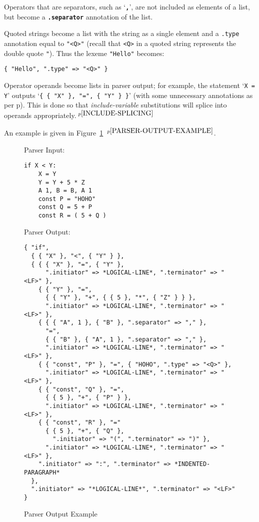\documentclass[12pt]{article}
\newcommand{\TT}[1]{{\tt \bfseries #1}}
\newcommand{\ttkey}[1]{{\tt \bfseries #1}}
\newcommand{\pagref}[1]{p\pageref{#1}}
\newcommand{\pagnote}[1]{$\,^{p\pageref{#1}}$}
\newlength{\figurewidth}
\newenvironment{boxedfigure}[1][!btp]%
	{\begin{figure*}[#1]
	 \begin{lrbox}{\figurebox}
	 \begin{minipage}{\figurewidth}

	 \vspace*{1ex}}%
	{
	 \vspace*{1ex}

	 \end{minipage}
	 \end{lrbox}

	 \centering
	 \fbox{\hspace*{0.1in}\usebox{\figurebox}\hspace*{0.1in}}
	 \end{figure*}}
\newenvironment{indpar}[1][0.3in]%
	{\begin{list}{}%
		     {\setlength{\itemsep}{0in}%
		      \setlength{\topsep}{0in}%
		      \setlength{\parsep}{1ex}%
		      \setlength{\labelwidth}{#1}%
		      \setlength{\leftmargin}{#1}%
		      \addtolength{\leftmargin}{\labelsep}}%
	 \item}%
	{\end{list}}
\begin{document}
Operators that are separators, such as `\TT{,}', are not included as elements
of a list, but become a \ttkey{.separator} annotation of the list.

Quoted strings become a list with the string as a single element
and a {\tt .type} annotation equal to {\tt "<Q>"}
(recall that {\tt <Q>} in a quoted string represents the double quote {\tt "}).
Thus the lexeme {\tt "Hello"} becomes: \\
\centerline{\tt \{ "Hello", ".type" => "<Q>" \} }

Operator operands become lists in parser output;
for example, the statement `{\tt X = Y}' outputs
`{\tt \{ \{ "X" \}, "=", \{ "Y" \} \}}' (with some unnecessary annotations as
per \pagref{UNNECESSARY-ANNOTATIONS}).
This is done so that {\em include-variable} substitutions will splice
into operands appropriately.\pagnote{INCLUDE-SPLICING}

An example is given in Figure~\ref{PARSER-OUTPUT-EXAMPLE}%
\pagnote{PARSER-OUTPUT-EXAMPLE}.

\begin{boxedfigure}[!p]
\begin{indpar}[1em]


Parser Input:
\begin{indpar}[1em]\begin{verbatim}
if X < Y:
    X = Y
    Y = Y + 5 * Z
    A 1, B = B, A 1
    const P = "HOHO"
    const Q = 5 + P
    const R = ( 5 + Q )
\end{verbatim}\end{indpar}

\medskip

Parser Output:
\begin{indpar}[1em]\begin{verbatim}
{ "if",
  { { "X" }, "<", { "Y" } },
  { { { "X" }, "=", { "Y" },
      ".initiator" => *LOGICAL-LINE*, ".terminator" => "<LF>" },
    { { "Y" }, "=",
      { { "Y" }, "+", { { 5 }, "*", { "Z" } } },
      ".initiator" => *LOGICAL-LINE*, ".terminator" => "<LF>" },
    { { { "A", 1 }, { "B" }, ".separator" => "," },
      "=",
      { { "B" }, { "A", 1 }, ".separator" => "," },
      ".initiator" => *LOGICAL-LINE*, ".terminator" => "<LF>" },
    { { "const", "P" }, "=", { "HOHO", ".type" => "<Q>" },
      ".initiator" => *LOGICAL-LINE*, ".terminator" => "<LF>" },
    { { "const", "Q" }, "=",
      { { 5 }, "+", { "P" } },
      ".initiator" => *LOGICAL-LINE*, ".terminator" => "<LF>" },
    { { "const", "R" }, "="
      { { 5 }, "+", { "Q" },
        ".initiator" => "(", ".terminator" => ")" },
      ".initiator" => *LOGICAL-LINE*, ".terminator" => "<LF>" },
    ".initiator" => ":", ".terminator" => *INDENTED-PARAGRAPH*
  },
  ".initiator" => "*LOGICAL-LINE*", ".terminator" => "<LF>"
}

\end{verbatim}\end{indpar}
\end{indpar}

\caption{Parser Output Example}
\label{PARSER-OUTPUT-EXAMPLE}
\end{boxedfigure}
\end{document}
